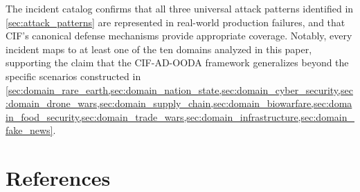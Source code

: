 \documentclass[
]{article}
\begin{document}
The incident catalog confirms that all three universal attack patterns
identified in \cref{sec:attack_patterns} are represented in real-world
production failures, and that CIF's canonical defense mechanisms provide
appropriate coverage. Notably, every incident maps to at least one of
the ten domains analyzed in this paper, supporting the claim that the
CIF-AD-OODA framework generalizes beyond the specific scenarios
constructed in
\cref{sec:domain_rare_earth,sec:domain_nation_state,sec:domain_cyber_security,sec:domain_drone_wars,sec:domain_supply_chain,sec:domain_biowarfare,sec:domain_food_security,sec:domain_trade_wars,sec:domain_infrastructure,sec:domain_fake_news}.

\newpage

\section{References}\label{sec:references}



\providecommand{\bibsection}{}
\renewcommand{\bibsection}{}


\end{document}
